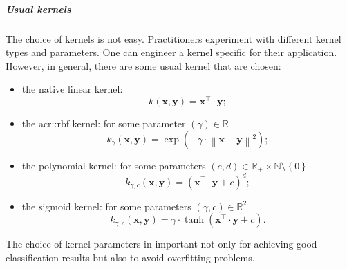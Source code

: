                 \subparagraph{Usual kernels}
                    The choice of kernels is not easy.
                    Practitioners experiment with different kernel types and parameters.
                    One can engineer a kernel specific for their application.
                    However, in general, there are some usual kernel that are chosen:
                    \begin{itemize}
                        \item the native linear kernel:
                        \begin{equation}
                            \label{eq::linear_kernel}
                            k(\bm{x}, \bm{y}) = \bm{x}^\intercal \cdot \bm{y};
                        \end{equation}
                        \item the \gls{acr::rbf} kernel: for some parameter $(\gamma) \in \mathbb{R}$
                        \begin{equation}
                            \label{eq::rbf_kernel}
                            k_{\gamma}(\bm{x}, \bm{y}) = \exp\left(-\gamma \cdot \left\lVert \bm{x} - \bm{y} \right\rVert^2\right);
                        \end{equation}
                        \item the polynomial kernel: for some parameters $(c, d) \in \mathbb{R}_+ \times \mathbb{N} \setminus \left\{0\right\} $
                        \begin{equation}
                            \label{eq::polynomial_kernel}
                            k_{\gamma, c}(\bm{x}, \bm{y}) = (\bm{x}^\intercal \cdot \bm{y} + c)^d;
                        \end{equation}
                        \item the sigmoid kernel: for some parameters $(\gamma, c) \in \mathbb{R}^2$
                        \begin{equation}
                            \label{eq::sigmoid_kernel}
                            k_{\gamma, c}(\bm{x}, \bm{y}) = \gamma \cdot \tanh(\bm{x}^\intercal \cdot \bm{y} + c).
                        \end{equation}
                    \end{itemize}
                    The choice of kernel parameters in important not only for achieving good classification results but also to avoid overfitting problems.

